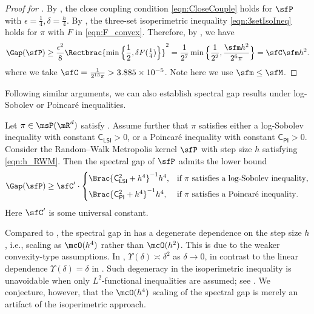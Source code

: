 \documentclass[11pt]{article}
\newcommand{\CPI}{\mathsf{C_{PI}}}
\newcommand{\CLSI}{\mathsf{C_{LSI}}}
\begin{document}
\begin{proof}[Proof for ]
%
By , the close coupling condition \eqref{eqn:CloseCouple} holds for $\sfP$ with $\epsilon = \frac{1}{4}, \delta = \frac{h}{4}$.
%
By , the three-set isoperimetric inequality \eqref{eqn:3setIsoIneq} holds for $\pi$ with $F$ in \eqref{eqn:F_convex}.
%
Therefore, by , we have
\begin{equation}
    \Gap(\sfP) \ge \frac{\epsilon^2}{8} \Rectbrac{ \min \Big\{ \frac{1}{2} , \delta F(\tfrac{1}{4}) \Big\} }^2 = \frac{1}{2^7} \min \Big\{ \frac{1}{2^2} , \frac{ \sfm h^2}{2^6 \pi} \Big\} = \sfC \sfm h^2.
\end{equation}
where we take $ \sfC = \frac{1}{2^{13}\pi}  > 3.885 \times 10^{-5} $.
Note here we use $\sfm \le \sfM$.
\end{proof}


Following similar arguments, we can also establish spectral gap results under log-Sobolev or Poincar\'e inequalities.

\begin{thm}
\label{thm:SpecRWN_func}
Let $\pi\in\msP(\mR^d)$ satisfy .
Assume further that $\pi$ satisfies either a log-Sobolev inequality with constant $\CLSI>0$, or a Poincar\'e inequality with constant $\CPI>0$.
Consider the Random--Walk Metropolis kernel $\sfP$ with step size $h$ satisfying \eqref{eqn:h_RWM}.
Then the spectral gap of $\sfP$ admits the lower bound
\begin{equation}
    \Gap (\sfP) \ge \sfC' \cdot
    \begin{cases}
        \Brac{ \mathsf{C_{LSI}^2} + h^4 }^{-1} h^4 , & \text{if $\pi$ satisfies a log-Sobolev inequality}, \\[5pt]
        \Brac{ \mathsf{C_{PI}^2} + h^4 }^{-1} h^4 , & \text{if $\pi$ satisfies a Poincar\'e inequality}.
    \end{cases}
\end{equation}
Here $\sfC'$ is some universal constant.
\end{thm}


\begin{rem}
Compared to , the spectral gap in  has a degenerate dependence on the step size $h$, i.e., scaling as $\mcO(h^{4})$ rather than $\mcO(h^{2})$.
%
This is due to the weaker convexity-type assumptions.
In , $\Upsilon(\delta) \asymp \delta^2$ as $\delta \to 0$, in contrast to the linear dependence $\Upsilon(\delta) = \delta$ in .
Such degeneracy in the isoperimetric inequality is unavoidable when only $L^2$-functional inequalities are assumed; see \cite{MR2507637}.
%
We conjecture, however, that the $\mcO(h^{4})$ scaling of the spectral gap is merely an artifact of the isoperimetric approach.
\end{rem}
\end{document}
